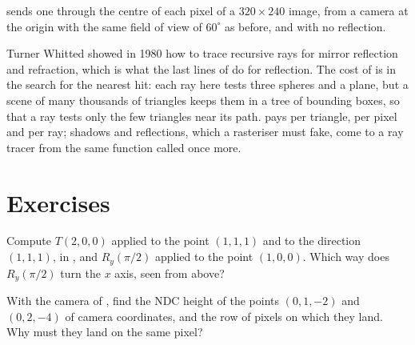  sends one  through the centre of each pixel of a $320 \times 240$ image, from a camera at the origin with the same field of view of $60^\circ$ as before, and with no reflection.

\label{out:b3:computer-graphics:raytrace}


Turner Whitted showed in 1980 how to trace recursive rays for mirror reflection and refraction, which is what the last lines of  do for reflection. %
The cost of  is in the search for the nearest hit: each ray here tests three spheres and a plane, but a scene of many thousands of triangles keeps them in a tree of bounding boxes, so that a ray tests only the few triangles near its path.  pays per triangle,  per pixel and per ray; shadows and reflections, which a rasteriser must fake, come to a ray tracer from the same function called once more.

\section{Exercises}\label{sec:b3:computer-graphics:exercises}

\begin{exercise}[$\star$]\label{exo:b3:computer-graphics:1}
Compute $T(2, 0, 0)$ applied to the point $(1, 1, 1)$ and to the direction $(1, 1, 1)$, in , and $R_y(\pi/2)$ applied to the point $(1, 0, 0)$. Which way does $R_y(\pi/2)$ turn the $x$ axis, seen from above?
\end{exercise}

\begin{exercise}[$\star$]\label{exo:b3:computer-graphics:2}
With the camera of , find the NDC height of the points $(0, 1, -2)$ and $(0, 2, -4)$ of camera coordinates, and the row of pixels on which they land. Why must they land on the same pixel?
\end{exercise}

